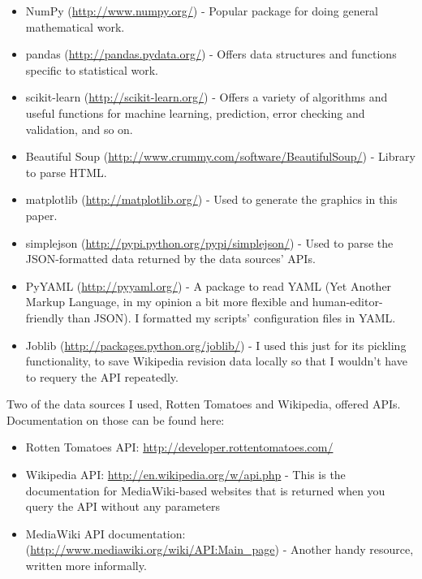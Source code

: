 \documentclass[10pt]{article}
\begin{document}
    \begin{itemize}
        \item \textsf{NumPy} (\url{http://www.numpy.org/}) - Popular package for doing general mathematical work. 
        \item \textsf{pandas} (\url{http://pandas.pydata.org/}) - Offers data structures and functions specific to statistical work. 
        \item \textsf{scikit-learn} (\url{http://scikit-learn.org/}) - Offers a variety of algorithms and useful functions for machine learning, prediction, error checking and validation, and so on. 
        \item \textsf{Beautiful Soup} (\url{http://www.crummy.com/software/BeautifulSoup/}) - Library to parse HTML. 
        \item \textsf{matplotlib} (\url{http://matplotlib.org/}) - Used to generate the graphics in this paper. 
        \item \textsf{simplejson} (\url{http://pypi.python.org/pypi/simplejson/}) - Used to parse the JSON-formatted data returned by the data sources' APIs. 
        \item \textsf{PyYAML} (\url{http://pyyaml.org/}) - A package to read YAML (Yet Another Markup Language, in my opinion a bit more flexible and human-editor-friendly than JSON). I formatted my scripts' configuration files in YAML. 
        \item \textsf{Joblib} (\url{http://packages.python.org/joblib/}) - I used this just for its pickling functionality, to save Wikipedia revision data locally so that I wouldn't have to requery the API repeatedly. 
    \end{itemize}
    
    Two of the data sources I used, Rotten Tomatoes and Wikipedia, offered APIs. Documentation on those can be found here: 
    
    \begin{itemize}
        \item Rotten Tomatoes API: \url{http://developer.rottentomatoes.com/}
        \item Wikipedia API: \url{http://en.wikipedia.org/w/api.php} - This is the documentation for MediaWiki-based websites that is returned when you query the API without any parameters
        \item MediaWiki API documentation: (\url{http://www.mediawiki.org/wiki/API:Main_page}) - Another handy resource, written more informally. 
    \end{itemize}
    
\end{document}
